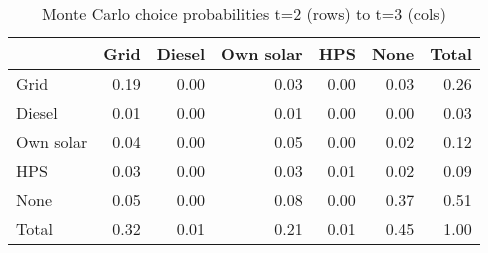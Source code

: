 \begin{table}[!ht]
	\centering
		\caption{Monte Carlo choice probabilities t=2 (rows) to t=3 (cols)}
\begin{tabular}{lrrrrrr}
		\toprule
               &      Grid&    Diesel& Own solar&       HPS&      None&     Total\\
		\midrule
		           Grid&      0.19&      0.00&      0.03&      0.00&      0.03&      0.26\\
		         Diesel&      0.01&      0.00&      0.01&      0.00&      0.00&      0.03\\
		      Own solar&      0.04&      0.00&      0.05&      0.00&      0.02&      0.12\\
		            HPS&      0.03&      0.00&      0.03&      0.01&      0.02&      0.09\\
		           None&      0.05&      0.00&      0.08&      0.00&      0.37&      0.51\\
		          Total&      0.32&      0.01&      0.21&      0.01&      0.45&      1.00\\
		\bottomrule
	\end{tabular}
\end{table}
